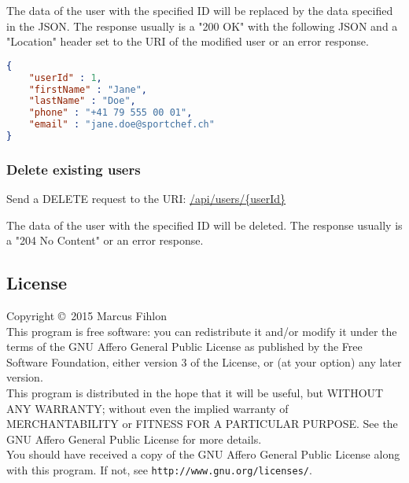 \documentclass[a4paper,openright,twoside]{report}
\renewcommand{\listoffigures}{\begingroup
	\tocchapter
	\tocfile{\listfigurename}{lof}
\endgroup}
\renewcommand{\listoftables}{\begingroup
	\tocchapter
	\tocfile{\listtablename}{lot}
\endgroup}
\begin{document}
The data of the user with the specified ID will be replaced by the data specified in the JSON. The response usually is a "200 OK" with the following JSON and a "Location" header set to the URI of the modified user or an error response.

\begin{lstlisting}[language=json]
{
	"userId" : 1,
	"firstName" : "Jane",
	"lastName" : "Doe",
	"phone" : "+41 79 555 00 01",
	"email" : "jane.doe@sportchef.ch"
}
\end{lstlisting}

\subsection{Delete existing users}
Send a DELETE request to the URI: \url{/api/users/{userId}}

The data of the user with the specified ID will be deleted. The response usually is a "204 No Content" or an error response.

\begin{appendix}

\listoffigures

\listoftables

\chapter{License}
Copyright \copyright\ 2015 Marcus Fihlon
\\[0.25cm]
This program is free software: you can redistribute it and/or modify it under the terms of the GNU Affero General Public License as published by the Free Software Foundation, either version 3 of the License, or (at your option) any later version.
\\[0.25cm]
This program is distributed in the hope that it will be useful, but WITHOUT ANY WARRANTY; without even the implied warranty of MERCHANTABILITY or FITNESS FOR A PARTICULAR PURPOSE. See the GNU Affero General Public License for more details.
\\[0.25cm]
You should have received a copy of the GNU Affero General Public License along with this program. If not, see \texttt{http://www.gnu.org/licenses/}.

\end{appendix}
\end{document}
